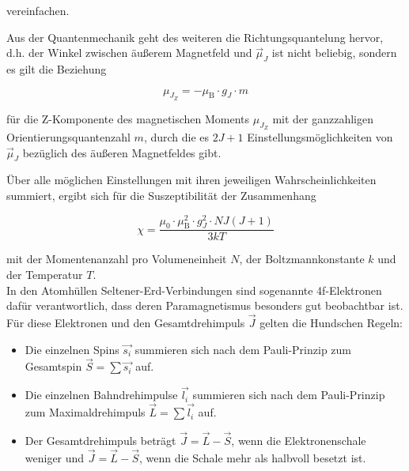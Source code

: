 vereinfachen.

Aus der Quantenmechanik geht des weiteren die Richtungsquantelung hervor, d.h.
der Winkel zwischen äußerem Magnetfeld und $\vec{\mu}_J$ ist nicht beliebig,
sondern es gilt die Beziehung 

\begin{equation}
    \mu_{J_Z} = - \mu_\text{B} \cdot g_J \cdot m
\end{equation}

für die Z-Komponente des magnetischen Moments $\mu_{J_Z}$ mit der ganzzahligen 
Orientierungsquantenzahl $m$, durch die es $2J+1$ Einstellungsmöglichkeiten
von $\vec{\mu}_J$ bezüglich des äußeren Magnetfeldes gibt. 

Über alle möglichen Einstellungen mit ihren jeweiligen Wahrscheinlichkeiten summiert,
ergibt sich für die Suszeptibilität der Zusammenhang

\begin{equation}
    \chi = \frac{\mu_0 \cdot \mu_\text{B}^2 \cdot g_J^2 \cdot N J (J+1)}{3kT}
\end{equation}

mit der Momentenanzahl pro Volumeneinheit $N$, der Boltzmannkonstante $k$ und der
Temperatur $T$.\\

In den Atomhüllen Seltener-Erd-Verbindungen sind sogenannte 4f-Elektronen dafür verantwortlich,
dass deren Paramagnetismus besonders gut beobachtbar ist. Für diese Elektronen und
den Gesamtdrehimpuls $\vec{J}$ gelten die Hundschen Regeln:

\begin{itemize}
    \item Die einzelnen Spins $\vec{s_i}$ summieren sich nach dem Pauli-Prinzip zum Gesamtspin
    $\vec{S} = \sum \vec{s_i}$ auf.
    \item Die einzelnen Bahndrehimpulse $\vec{l_i}$ summieren sich nach dem Pauli-Prinzip zum Maximaldrehimpuls 
    $\vec{L} = \sum \vec{l_i}$ auf.
    \item Der Gesamtdrehimpuls beträgt $\vec{J} = \vec{L} - \vec{S}$, wenn die Elektronenschale weniger und
    $\vec{J} = \vec{L} - \vec{S}$, wenn die Schale mehr als halbvoll besetzt ist.
\end{itemize}





















